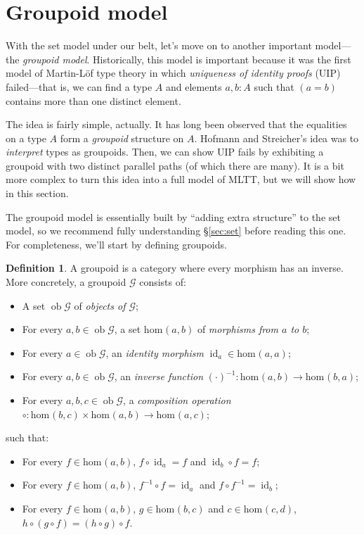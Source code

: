\documentclass{article}
\theoremstyle{definition}
\newtheorem{definition}{Definition}[section]
\newcommand{\G}{\mathcal{G}}
\DeclareMathOperator{\ob}{ob}
\renewcommand{\hom}[3][]{\mathrm{hom}_{#1}\mathopen{}\left( #2, #3 \right)\mathclose{}}
\newcommand{\inv}[1]{#1^{-1}}
\DeclareMathOperator{\id}{id}				    %
\begin{document}
\section{Groupoid model}
\label{sec:gpd}

With the set model under our belt, let's move on to another important model---the \textit{groupoid model}. Historically, this model is important because it was the first model of Martin-L\"of type theory in which \textit{uniqueness of identity proofs} (UIP) failed---that is, we can find a type $A$ and elements $a, b : A$ such that $(a = b)$ contains more than one distinct element.

The idea is fairly simple, actually. It has long been observed that the equalities on a type $A$ form a \textit{groupoid} structure on $A$. Hofmann and Streicher's idea was to \textit{interpret} types as groupoids. Then, we can show UIP fails by exhibiting a groupoid with two distinct parallel paths (of which there are many). It is a bit more complex to turn this idea into a full model of MLTT, but we will show how in this section.

The groupoid model is essentially built by ``adding extra structure'' to the set model, so we recommend fully understanding \S\ref{sec:set} before reading this one. For completeness, we'll start by defining groupoids.

\begin{definition}
    A groupoid is a category where every morphism has an inverse. More concretely, a groupoid $\G$ consists of:
    \begin{itemize}
        \item A set $\ob\G$ of \textit{objects of $\G$};
        
        \item For every $a, b \in \ob\G$, a set $\hom{a}{b}$ of \textit{morphisms from $a$ to $b$};
        
        \item For every $a \in \ob\G$, an \textit{identity morphism} $\id_a \in \hom{a}{a}$;
        
        \item For every $a, b \in \ob\G$, an \textit{inverse function} $\inv{(\cdot)}\colon \hom{a}{b} \to \hom{b}{a}$;
        
        \item For every $a, b, c \in \ob\G$, a \textit{composition operation} $\circ\colon \hom{b}{c} \times \hom{a}{b} \to \hom{a}{c}$;
    \end{itemize}
    such that:
    \begin{itemize}
        \item For every $f \in \hom{a}{b}$, $f \circ \id_a = f$ and $\id_b \circ f = f$;
        
        \item For every $f \in \hom{a}{b}$, $\inv{f} \circ f = \id_a$ and $f \circ \inv{f} = \id_b$;
        
        \item For every $f \in \hom{a}{b}$, $g \in \hom{b}{c}$ and $c \in \hom{c}{d}$, $h \circ (g \circ f) = (h \circ g) \circ f$.
    \end{itemize}
\end{definition}
\end{document}
